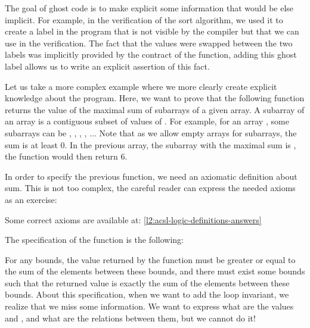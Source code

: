 

The goal of ghost code is to make explicit some information that would be else
implicit. For example, in the verification of the sort algorithm, we used it
to create a label in the program that is not visible by the compiler but that
we can use in the verification. The fact that the values were swapped between the
two labels was implicitly provided by the contract of the function, adding this
ghost label allows us to write an explicit assertion of this fact.



Let us take a more complex example where we more clearly create explicit
knowledge about the program. Here, we want to prove that the
following function returns the value of the maximal sum of subarrays of
a given array. A subarray of an array  is a contiguous subset
of values of . For example, for an array ,
some subarrays can be
\CodeInline{\{\}}, , ,
, ... Note that as we allow
empty arrays for subarrays, the sum is at least 0. In the previous
array, the subarray with the maximal sum is ,
the function would then return 6.






In order to specify the previous function, we need an axiomatic
definition about sum. This is not too complex, the careful reader
can express the needed axioms as an exercise:






Some correct axioms are available at: \ref{l2:acsl-logic-definitions-answers}



The specification of the function is the following:






For any bounds, the value returned by the function must be greater or
equal to the sum of the elements between these bounds, and there must
exist some bounds such that the returned value is exactly the sum of the
elements between these bounds. About this specification, when we want to
add the loop invariant, we realize that we miss some information.
We want to express what are the values  and ,
and what are the relations between them, but we cannot do it!


